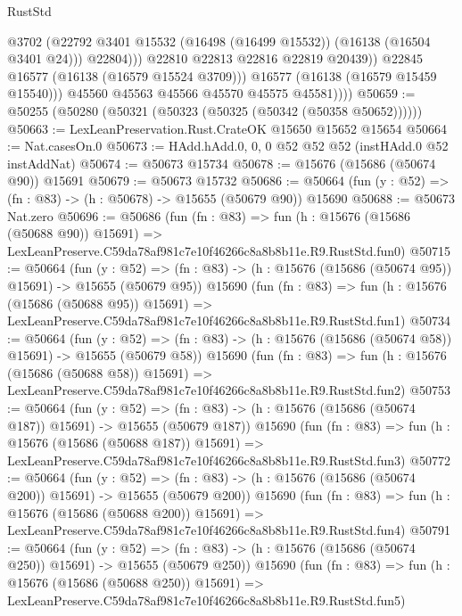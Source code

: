 \begin{lexlean}{RustStd}
\begin{coremodule}
                          @3702
                          (@22792 @3401 @15532 (@16498 (@16499 @15532)) (@16138 (@16504 @3401 @24)))
                          @22804)))
                    @22810
                    @22813
                    @22816
                    @22819
                    @20439))
                @22845
                @16577
                (@16138 (@16579 @15524 @3709)))
              @16577
              (@16138 (@16579 @15459 @15540)))
            @45560
            @45563
            @45566
            @45570
            @45575
            @45581))))
@50659 := @50255 (@50280 (@50321 (@50323 (@50325 (@50342 (@50358 @50652))))))
@50663 := LexLeanPreservation.Rust.CrateOK @15650 @15652 @15654
@50664 := Nat.casesOn.{0}
@50673 := HAdd.hAdd.{0, 0, 0} @52 @52 @52 (instHAdd.{0} @52 instAddNat)
@50674 := @50673 @15734
@50678 := @15676 (@15686 (@50674 @90)) @15691
@50679 := @50673 @15732
@50686 := @50664 (fun (y : @52) => (fn : @83) -> (h : @50678) -> @15655 (@50679 @90)) @15690
@50688 := @50673 Nat.zero
@50696 := @50686
    (fun (fn : @83) =>
    fun (h : @15676 (@15686 (@50688 @90)) @15691) =>
    LexLeanPreserve.C59da78af981c7e10f46266c8a8b8b11e.R9.RustStd.fun0)
@50715 := @50664
    (fun (y : @52) =>
    (fn : @83) -> (h : @15676 (@15686 (@50674 @95)) @15691) -> @15655 (@50679 @95))
    @15690
    (fun (fn : @83) =>
    fun (h : @15676 (@15686 (@50688 @95)) @15691) =>
    LexLeanPreserve.C59da78af981c7e10f46266c8a8b8b11e.R9.RustStd.fun1)
@50734 := @50664
    (fun (y : @52) =>
    (fn : @83) -> (h : @15676 (@15686 (@50674 @58)) @15691) -> @15655 (@50679 @58))
    @15690
    (fun (fn : @83) =>
    fun (h : @15676 (@15686 (@50688 @58)) @15691) =>
    LexLeanPreserve.C59da78af981c7e10f46266c8a8b8b11e.R9.RustStd.fun2)
@50753 := @50664
    (fun (y : @52) =>
    (fn : @83) -> (h : @15676 (@15686 (@50674 @187)) @15691) -> @15655 (@50679 @187))
    @15690
    (fun (fn : @83) =>
    fun (h : @15676 (@15686 (@50688 @187)) @15691) =>
    LexLeanPreserve.C59da78af981c7e10f46266c8a8b8b11e.R9.RustStd.fun3)
@50772 := @50664
    (fun (y : @52) =>
    (fn : @83) -> (h : @15676 (@15686 (@50674 @200)) @15691) -> @15655 (@50679 @200))
    @15690
    (fun (fn : @83) =>
    fun (h : @15676 (@15686 (@50688 @200)) @15691) =>
    LexLeanPreserve.C59da78af981c7e10f46266c8a8b8b11e.R9.RustStd.fun4)
@50791 := @50664
    (fun (y : @52) =>
    (fn : @83) -> (h : @15676 (@15686 (@50674 @250)) @15691) -> @15655 (@50679 @250))
    @15690
    (fun (fn : @83) =>
    fun (h : @15676 (@15686 (@50688 @250)) @15691) =>
    LexLeanPreserve.C59da78af981c7e10f46266c8a8b8b11e.R9.RustStd.fun5)

\end{coremodule}
\end{lexlean}
